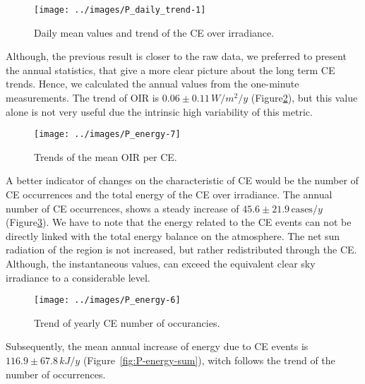 \documentclass[preprint, 3p,
authoryear]{elsarticle} %
\begin{document}
\begin{figure}

{\centering \texttt{[image: ../images/P\_daily\_trend-1]} 

}

\caption{Daily mean values and trend of the CE over irradiance.}\label{fig:CEmeanDaily}
\end{figure}

Although, the previous result is closer to the raw data, we preferred to
present the annual statistics, that give a more clear picture about the
long term CE trends. Hence, we calculated the annual values from the
one-minute measurements. The trend of OIR is \(0.06\pm 0.11\,W/m^2/y\)
(Figure\nobreakspace{}\ref{fig:P-energy-mean}), but this value alone is
not very useful due the intrinsic high variability of this metric.

\begin{figure}

{\centering \texttt{[image: ../images/P\_energy-7]} 

}

\caption{Trends of the mean OIR per CE.}\label{fig:P-energy-mean}
\end{figure}

A better indicator of changes on the characteristic of CE would be the
number of CE occurrences and the total energy of the CE over irradiance.
The annual number of CE occurrences, shows a steady increase of
\(45.6\pm 21.9\,\text{cases}/y\)
(Figure\nobreakspace{}\ref{fig:P-energy-N}). We have to note that the
energy related to the CE events can not be directly linked with the
total energy balance on the atmosphere. The net sun radiation of the
region is not increased, but rather redistributed through the CE.
Although, the instantaneous values, can exceed the equivalent clear sky
irradiance to a considerable level.

\begin{figure}

{\centering \texttt{[image: ../images/P\_energy-6]} 

}

\caption{Trend of yearly CE number of occurancies.}\label{fig:P-energy-N}
\end{figure}

Subsequently, the mean annual increase of energy due to CE events is
\(116.9\pm 67.8\,kJ/y\) (Figure~\ref{fig:P-energy-sum}), witch follows
the trend of the number of occurrences.
\end{document}
